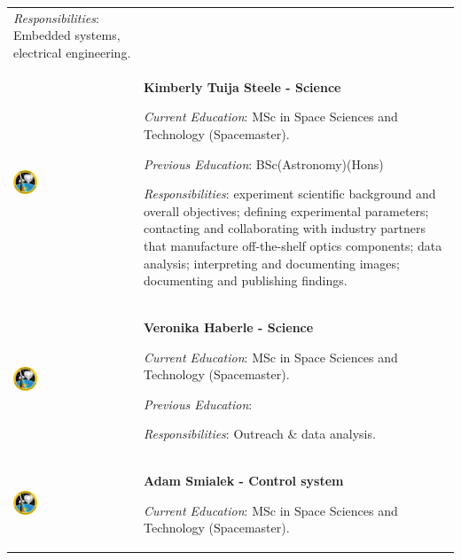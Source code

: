 \begin{longtable}[]{m{} m{}}
\smallskip
\textit{Responsibilities}: Embedded systems, electrical engineering.
\bigskip
\\
 \includegraphics[width=0.2\textwidth]{0-cover/img/logo-rexus-bexus.png}  & \textbf{Kimberly Tuija Steele - Science}

\smallskip
\textit{Current Education}: MSc in Space Sciences and Technology (Spacemaster).

\smallskip
\textit{Previous Education}: BSc(Astronomy)(Hons)

\smallskip
\textit{Responsibilities}: experiment scientific background and overall objectives; defining experimental parameters; contacting and collaborating with industry partners that manufacture off-the-shelf optics components; data analysis; interpreting and documenting images; documenting and publishing findings.

\bigskip
\\
 \includegraphics[width=0.2\textwidth]{0-cover/img/logo-rexus-bexus.png}  & \textbf{Veronika Haberle - Science}

\smallskip
\textit{Current Education}: MSc in Space Sciences and Technology (Spacemaster).

\smallskip
\textit{Previous Education}:

\smallskip
\textit{Responsibilities}: Outreach \& data analysis.
\bigskip
\\
 \includegraphics[width=0.2\textwidth]{0-cover/img/logo-rexus-bexus.png}  & \textbf{Adam Smialek - Control system}

\smallskip
\textit{Current Education}: MSc in Space Sciences and Technology (Spacemaster).


\end{longtable}

